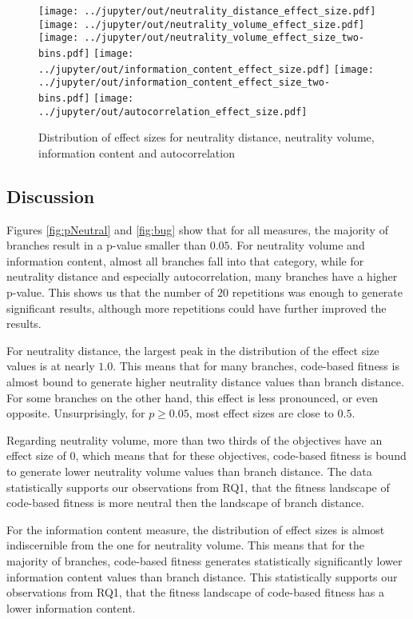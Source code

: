 \begin{figure}[h]
	\texttt{[image: ../jupyter/out/neutrality\_distance\_effect\_size.pdf]}
	\texttt{[image: ../jupyter/out/neutrality\_volume\_effect\_size.pdf]}
	\texttt{[image: ../jupyter/out/neutrality\_volume\_effect\_size\_two-bins.pdf]}
	\texttt{[image: ../jupyter/out/information\_content\_effect\_size.pdf]}
	\texttt{[image: ../jupyter/out/information\_content\_effect\_size\_two-bins.pdf]}
	\texttt{[image: ../jupyter/out/autocorrelation\_effect\_size.pdf]}
	\caption{Distribution of effect sizes for neutrality distance, neutrality volume, information content and autocorrelation}\label{fig:us}
\end{figure}

\subsection{Discussion}

Figures \ref{fig:pNeutral} and \ref{fig:bug} show that for all measures, the majority of branches result in a p-value smaller than $0.05$. For neutrality volume and information content, almost all branches fall into that category, while for neutrality distance and especially autocorrelation, many branches have a higher p-value.
This shows us that the number of $20$ repetitions was enough to generate significant results, although more repetitions could have further improved the results.

For neutrality distance, the largest peak in the distribution of the effect size values is at nearly $1.0$.
This means that for many branches, code-based fitness is almost bound to generate higher neutrality distance values than branch distance.
For some branches on the other hand, this effect is less pronounced, or even opposite.
Unsurprisingly, for $p \geq 0.05$, most effect sizes are close to $0.5$.

Regarding neutrality volume, more than two thirds of the objectives have an effect size of $0$, which means that for these objectives, code-based fitness is bound to generate lower neutrality volume values than branch distance.
The data statistically supports our observations from RQ1, that the fitness landscape of code-based fitness is more neutral then the landscape of branch distance.

For the information content measure, the distribution of effect sizes is almost indiscernible from the one for neutrality volume.
This means that for the majority of branches, code-based fitness generates statistically significantly lower information content values than branch distance.
This statistically supports our observations from RQ1, that the fitness landscape  of code-based fitness has a lower information content.

